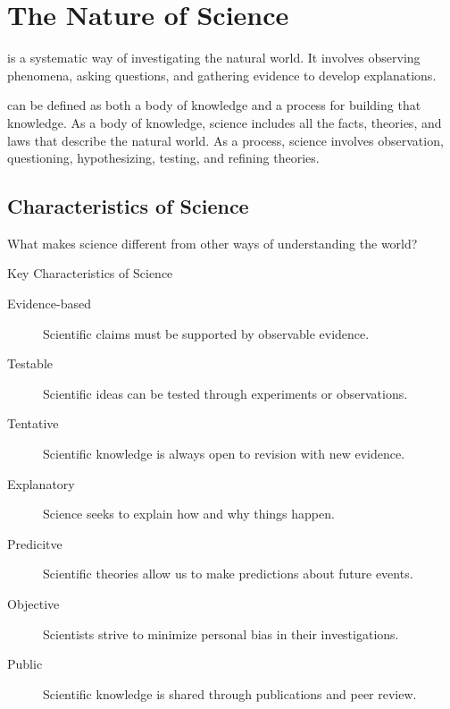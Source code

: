 \section{The Nature of Science}

 is a systematic way of investigating the natural world. It involves observing phenomena, asking questions, and gathering evidence to develop explanations.

 can be defined as both a body of knowledge and a process for building that knowledge. As a body of knowledge, science includes all the facts, theories, and laws that describe the natural world. As a process, science involves observation, questioning, hypothesizing, testing, and refining theories.


\subsection{Characteristics of Science}

What makes science different from other ways of understanding the world?

\begin{keyconcept}{Key Characteristics of Science}
\begin{description}
    \item[Evidence-based] Scientific claims must be supported by observable evidence.
    \item[Testable] Scientific ideas can be tested through experiments or observations.
    \item[Tentative] Scientific knowledge is always open to revision with new evidence.
    \item[Explanatory] Science seeks to explain how and why things happen.
    \item[Predicitve] Scientific theories allow us to make predictions about future events.
    \item[Objective] Scientists strive to minimize personal bias in their investigations.
    \item[Public] Scientific knowledge is shared through publications and peer review.
\end{description}
\end{keyconcept}

